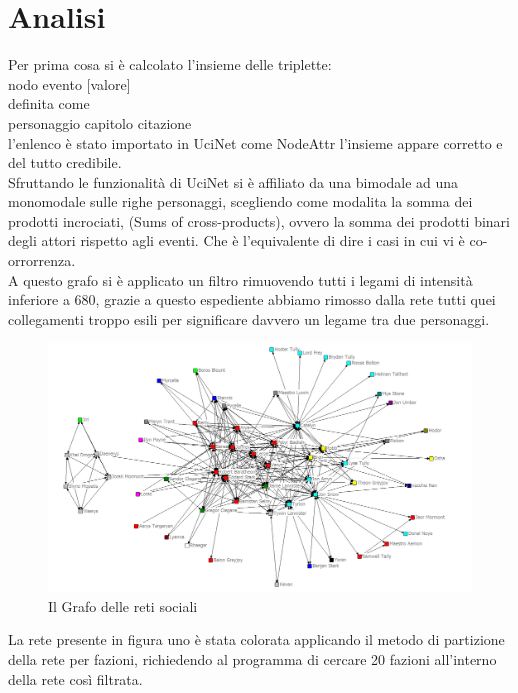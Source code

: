 \documentclass[a4paper]{article}
\begin{document}
\section{Analisi}
Per prima cosa si è calcolato l'insieme delle triplette:\\
nodo evento [valore]\\
definita come\\
personaggio capitolo citazione\\
l'enlenco è stato importato in UciNet come NodeAttr l'insieme appare corretto e del tutto credibile.\\
Sfruttando le funzionalità di UciNet si è affiliato da una bimodale ad una monomodale sulle righe personaggi, scegliendo come modalita la somma dei prodotti incrociati, (Sums of cross-products), ovvero la somma dei prodotti binari degli attori rispetto agli eventi. Che è l'equivalente di dire i casi in cui vi è co-orrorrenza.\\
A questo grafo si è applicato un filtro rimuovendo tutti i legami di intensità inferiore a 680, grazie a questo espediente abbiamo rimosso dalla rete tutti quei collegamenti troppo esili per significare davvero un legame tra due personaggi. 
\begin{figure}[h]
\centering
\includegraphics[width=.9\textwidth]{picture/029.png}
\caption{Il Grafo delle reti sociali}
\end{figure}
La rete presente in figura uno è stata colorata applicando il metodo di partizione della rete per fazioni, richiedendo al programma di cercare 20 fazioni all'interno della rete così filtrata.\\
\end{document}
